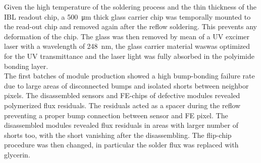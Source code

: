 Given the high temperature of the soldering process and the thin thickness of the IBL readout chip, a \SI{500}{\micro\meter} thick glass carrier chip was temporally mounted to the read-out chip and removed again after the reflow soldering. This prevents any deformation of the chip.
The glass was then removed by mean of a UV excimer laser with a wavelength of \SI{248}{\nano\meter}, the glass carrier material waswas optimized for the UV transmittance and the laser light was fully absorbed in the polyimide bonding layer.\\
The first batches of module production showed a high bump-bonding failure rate due to large areas of disconnected bumps and isolated shorts between neighbor pixels.
The disassembled sensors and FE-chips of defective modules revealed polymerized flux residuals. The residuals acted as a spacer during the reflow preventing a proper bump connection between sensor and FE pixel. The disassembled modules revealed flux residuals in areas with larger number of shorts too, with the short vanishing after the disassembling. The flip-chip procedure was then changed, in particular the solder flux was replaced with glycerin.\cite{bump_bonding}


